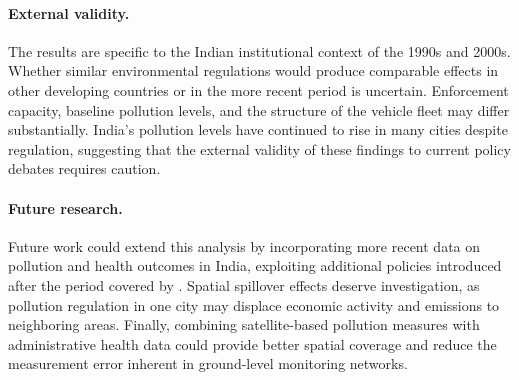 \documentclass[10pt]{article}
\begin{document}
\paragraph{External validity.} The results are specific to the Indian institutional context of the 1990s and 2000s. Whether similar environmental regulations would produce comparable effects in other developing countries or in the more recent period is uncertain. Enforcement capacity, baseline pollution levels, and the structure of the vehicle fleet may differ substantially. India's pollution levels have continued to rise in many cities despite regulation, suggesting that the external validity of these findings to current policy debates requires caution.

\paragraph{Future research.} Future work could extend this analysis by incorporating more recent data on pollution and health outcomes in India, exploiting additional policies introduced after the period covered by \citet{greenstone2014}. Spatial spillover effects deserve investigation, as pollution regulation in one city may displace economic activity and emissions to neighboring areas. Finally, combining satellite-based pollution measures with administrative health data could provide better spatial coverage and reduce the measurement error inherent in ground-level monitoring networks.


\clearpage
\end{document}
